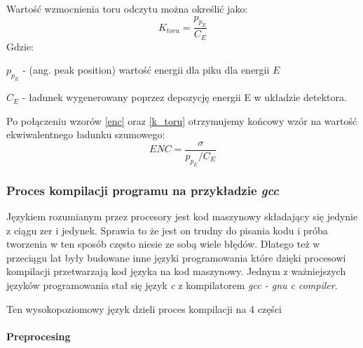 \noindent
Wartość wzmocnienia toru odczytu można określić jako:
\begin{equation}
        \label{k_toru}
        K_{toru} = \frac{p_{p_E}}{C_E}
\end{equation}
Gdzie:
\begin{description}
        \item  $p_{p_E}$ - (ang. peak position) wartość energii dla piku dla energii $E$
        \item  $C_E$ - ładunek wygenerowany poprzez depozycję energii E w układzie detektora.
\end{description}

Po połączeniu wzorów \ref{enc} oraz \ref{k_toru} otrzymujemy końcowy wzór na wartość ekwiwalentnego ładunku szumowego:
\begin{equation}
        ENC = \frac{\sigma}{p_{p_E}/C_E}
\end{equation}


\subsubsection{Proces kompilacji programu na przykładzie \textit{gcc}}

Językiem rozumianym przez procesory jest kod maszynowy składający się jedynie z ciągu zer i jedynek.
Sprawia to że jest on trudny do pisania kodu i próba tworzenia w ten sposób często niesie ze sobą wiele błędów. 
Dlatego też w przeciągu lat były budowane inne języki programowania które dzięki procesowi kompilacji przetwarzają kod języka na kod maszynowy. 
Jednym z ważniejszych języków programowania stał się język \textit{c} z kompilatorem \textit{gcc - gnu c compiler}\cite{gcc}. 

Ten wysokopoziomowy język dzieli proces kompilacji na 4 części

\paragraph{Preprocesing}

